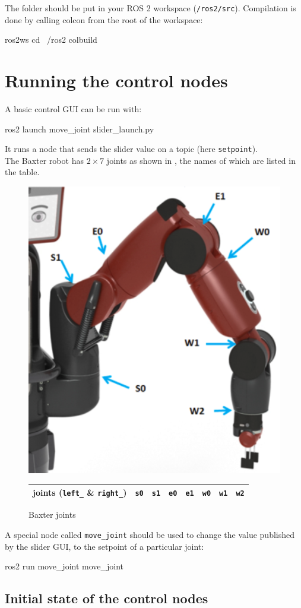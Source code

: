 \documentclass{ecnreport}
\begin{document}
The folder should be put in your ROS 2 workspace (\texttt{\texttilde/ros2/src}). Compilation is done by calling colcon from the root of the workspace:
\begin{bashcodelarge}
 ros2ws
 cd ~/ros2
 colbuild
\end{bashcodelarge}

\section{Running the control nodes}

A basic control GUI can be run with:

\begin{bashcodelarge}
 ros2 launch move_joint slider_launch.py
\end{bashcodelarge}
It runs a node that sends the slider value on a topic (here \texttt{setpoint}).\\

The Baxter robot has $2\times 7$ joints as shown in , the names of which are listed in the table.
\begin{figure}[h]\centering
 \includegraphics[width=.3\linewidth]{baxter} \\
  \begin{tabular}{|c|c|c|c|c|c|c|c|}
  \hline
  joints (\texttt{left\_} \& \texttt{right\_})& \texttt{s0} & \texttt{s1}& \texttt{e0} & \texttt{e1} & \texttt{w0} & \texttt{w1} & \texttt{w2} \\\hline
 \end{tabular}
 \caption{Baxter joints}
 \label{baxter}
\end{figure}

A special node called \texttt{move\_joint} should be used to change the value published by the slider GUI, to the setpoint of a particular joint:
\begin{bashcodelarge}
 ros2 run move_joint move_joint
\end{bashcodelarge}

\subsection{Initial state of the control nodes}
\end{document}
